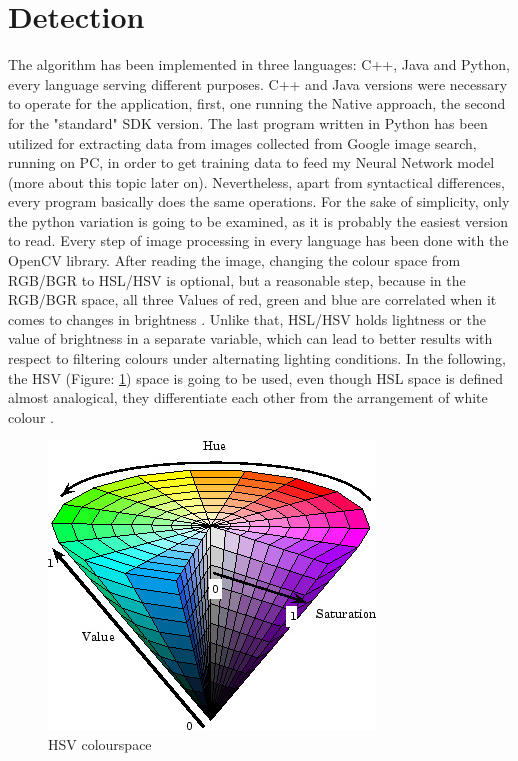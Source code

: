 \section{Detection}\label{extraction}
The algorithm has been implemented in three languages: C++, Java and Python, every language serving different purposes. C++ and Java versions were necessary to operate for the application, first, one running the Native approach, the second for the "standard" SDK version. The last program written in Python has been utilized for extracting data from images collected from Google image search, running on PC, in order to get training data to feed my Neural Network model (more about this topic later on). Nevertheless, apart from syntactical differences, every program basically does the same operations. For the sake of simplicity, only the python variation is going to be examined, as it is probably the easiest version to read. Every step of image processing in every language has been done with the OpenCV library. \newline
After reading the image, changing the colour space from RGB/BGR to HSL/HSV is optional, but a reasonable step, because in the RGB/BGR space, all three Values of red, green and blue are correlated when it comes to changes in brightness \cite{imagesegmentation}. Unlike that, HSL/HSV holds lightness or the value of brightness in a separate variable, which can lead to better results with respect to filtering colours under alternating lighting conditions. In the following, the HSV (Figure: \ref{fig:hsv}) space is going to be used, even though HSL space is defined almost analogical, they differentiate each other from the arrangement of white colour \cite{zynq}. \newline

\begin{figure}[H]
	\centering
	\includegraphics[width=\linewidth]{images/hsv.jpg}
	\caption{HSV colourspace\protect\footnotemark}\label{fig:hsv}
	\endminipage\hfill
\end{figure}



